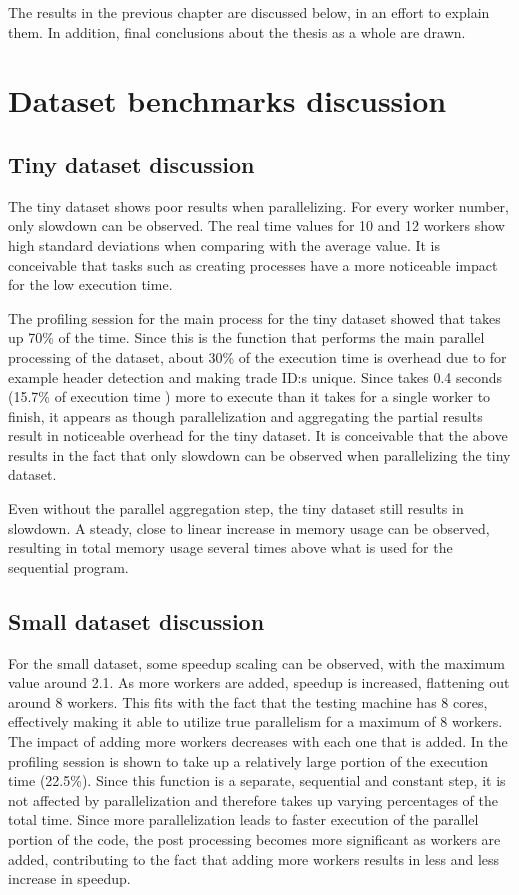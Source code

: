 The results in the previous chapter are discussed below, in an effort to explain them. In addition, final conclusions
about the thesis as a whole are drawn.

\section{Dataset benchmarks discussion}
\subsection{Tiny dataset discussion}
The tiny dataset shows poor results when parallelizing. For every worker number, only slowdown can be observed.
The real time values for 10 and 12 workers show high standard deviations when comparing with the average value. It is conceivable that
tasks such as creating processes have a more noticeable impact for the low execution time.

The profiling session for the main process for the tiny dataset showed that  takes up 70\% of the time. Since this is the function
that performs the main parallel processing of the dataset, about 30\% of the execution time is overhead due to for example header detection
and making trade ID:s unique. Since  takes 0.4 seconds (15.7\% of execution time ) more to execute than it takes for a single worker to finish,
it appears as though parallelization and aggregating the partial results result in noticeable overhead for the tiny dataset.
It is conceivable that the above results in the fact that only slowdown can be observed when parallelizing the tiny dataset.

Even without the parallel aggregation step, the tiny dataset still results in slowdown. A steady, close to linear increase in memory usage can be observed,
resulting in total memory usage several times above what is used for the sequential program.

\subsection{Small dataset discussion}
For the small dataset, some speedup scaling can be observed, with the maximum value around 2.1. As more workers are added, speedup is increased,
flattening out around 8 workers. This fits with the fact that the testing machine has 8 cores, effectively making it able to utilize 
true parallelism for a maximum of 8 workers. The impact of adding more workers decreases with each one that is added. In the profiling session
 is shown to take up a relatively large portion of the execution time (22.5\%). Since this function is a separate,
sequential and constant step, it is not affected by parallelization and therefore takes up varying percentages of the total time. Since more parallelization
leads to faster execution of the parallel portion of the code, the post processing becomes more significant as workers are added, contributing to the fact
that adding more workers results in less and less increase in speedup.

